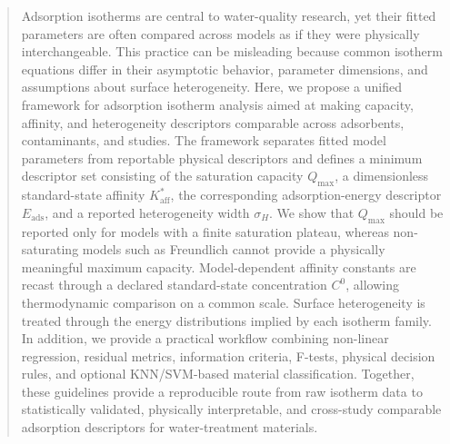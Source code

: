 \documentclass[journal=jacsat,manuscript=article]{achemso}
\begin{document}
	\begin{abstract}
		Adsorption isotherms are central to water-quality research, yet their fitted parameters are often compared across models as if they were physically interchangeable. This practice can be misleading because common isotherm equations differ in their asymptotic behavior, parameter dimensions, and assumptions about surface heterogeneity. Here, we propose a unified framework for adsorption isotherm analysis aimed at making capacity, affinity, and heterogeneity descriptors comparable across adsorbents, contaminants, and studies. The framework separates fitted model parameters from reportable physical descriptors and defines a minimum descriptor set consisting of the saturation capacity $Q_{\max}$, a dimensionless standard-state affinity $K_{\mathrm{aff}}^{\ast}$, the corresponding adsorption-energy descriptor $E_{\mathrm{ads}}$, and a reported heterogeneity width $\sigma_H$. We show that $Q_{\max}$ should be reported only for models with a finite saturation plateau, whereas non-saturating models such as Freundlich cannot provide a physically meaningful maximum capacity. Model-dependent affinity constants are recast through a declared standard-state concentration $C^0$, allowing thermodynamic comparison on a common scale. Surface heterogeneity is treated through the energy distributions implied by each isotherm family. In addition, we provide a practical workflow combining non-linear regression, residual metrics, information criteria, F-tests, physical decision rules, and optional KNN/SVM-based material classification. Together, these guidelines provide a reproducible route from raw isotherm data to statistically validated, physically interpretable, and cross-study comparable adsorption descriptors for water-treatment materials.
	\end{abstract}
	
\end{document}
